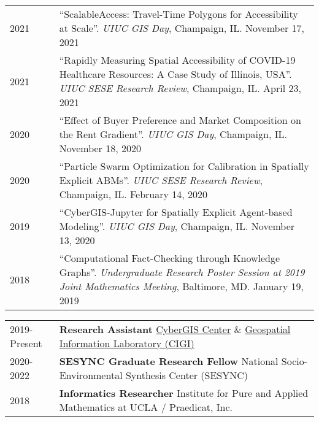 \documentclass{acmcv}
\begin{document}
    \begin{longtable}{p{0.16\linewidth} p{0.84\linewidth}}
        2021 & ``ScalableAccess: Travel-Time Polygons for Accessibility at Scale''. \textit{UIUC GIS Day}, Champaign, IL. November 17, 2021 \\

        2021 & ``Rapidly Measuring Spatial Accessibility of COVID-19 Healthcare Resources: A Case Study of Illinois, USA''. \textit{UIUC SESE Research Review}, Champaign, IL. April 23, 2021 \\ 

        2020 & ``Effect of Buyer Preference and Market Composition on the Rent Gradient''. \textit{UIUC GIS Day}, Champaign, IL. November 18, 2020 \\

        2020 & ``Particle Swarm Optimization for Calibration in Spatially Explicit ABMs''. \textit{UIUC SESE Research Review}, Champaign, IL. February 14, 2020 \\ 

        2019 & ``CyberGIS-Jupyter for Spatially Explicit Agent-based Modeling''. \textit{UIUC GIS Day}, Champaign, IL. November 13, 2020 \\

        2018 & ``Computational Fact-Checking through Knowledge Graphs''. \textit{Undergraduate Research Poster Session at 2019 Joint Mathematics Meeting}, Baltimore, MD. January 19, 2019 \\
    \end{longtable}


    \begin{longtable}{p{0.16\linewidth} p{0.84\linewidth}}
        2019-Present & \textbf{Research Assistant} \newline \href{https://cybergis.illinois.edu/}{CyberGIS Center} \& \href{http://www.cigi.illinois.edu/}{Geospatial Information Laboratory (CIGI)}\\

        2020-2022 & \textbf{SESYNC Graduate Research Fellow} \newline National Socio-Environmental Synthesis Center (SESYNC)\\

        2018 & \textbf{Informatics Researcher} \newline Institute for Pure and Applied Mathematics at UCLA / Praedicat, Inc.\\
    \end{longtable}
\end{document}
